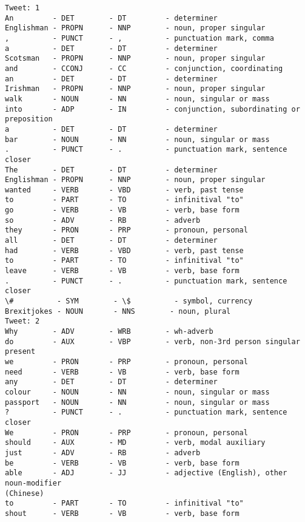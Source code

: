     \begin{Verbatim}[commandchars=\\\{\}]
Tweet: 1
An         - DET        - DT         - determiner
Englishman - PROPN      - NNP        - noun, proper singular
,          - PUNCT      - ,          - punctuation mark, comma
a          - DET        - DT         - determiner
Scotsman   - PROPN      - NNP        - noun, proper singular
and        - CCONJ      - CC         - conjunction, coordinating
an         - DET        - DT         - determiner
Irishman   - PROPN      - NNP        - noun, proper singular
walk       - NOUN       - NN         - noun, singular or mass
into       - ADP        - IN         - conjunction, subordinating or preposition
a          - DET        - DT         - determiner
bar        - NOUN       - NN         - noun, singular or mass
.          - PUNCT      - .          - punctuation mark, sentence closer
The        - DET        - DT         - determiner
Englishman - PROPN      - NNP        - noun, proper singular
wanted     - VERB       - VBD        - verb, past tense
to         - PART       - TO         - infinitival "to"
go         - VERB       - VB         - verb, base form
so         - ADV        - RB         - adverb
they       - PRON       - PRP        - pronoun, personal
all        - DET        - DT         - determiner
had        - VERB       - VBD        - verb, past tense
to         - PART       - TO         - infinitival "to"
leave      - VERB       - VB         - verb, base form
.          - PUNCT      - .          - punctuation mark, sentence closer
\#          - SYM        - \$          - symbol, currency
Brexitjokes - NOUN       - NNS        - noun, plural
Tweet: 2
Why        - ADV        - WRB        - wh-adverb
do         - AUX        - VBP        - verb, non-3rd person singular present
we         - PRON       - PRP        - pronoun, personal
need       - VERB       - VB         - verb, base form
any        - DET        - DT         - determiner
colour     - NOUN       - NN         - noun, singular or mass
passport   - NOUN       - NN         - noun, singular or mass
?          - PUNCT      - .          - punctuation mark, sentence closer
We         - PRON       - PRP        - pronoun, personal
should     - AUX        - MD         - verb, modal auxiliary
just       - ADV        - RB         - adverb
be         - VERB       - VB         - verb, base form
able       - ADJ        - JJ         - adjective (English), other noun-modifier
(Chinese)
to         - PART       - TO         - infinitival "to"
shout      - VERB       - VB         - verb, base form

\end{Verbatim}
